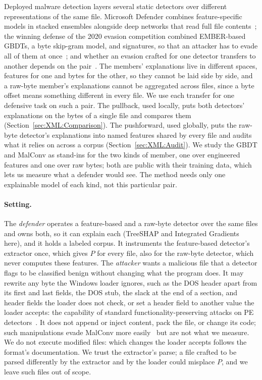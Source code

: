 Deployed malware detection layers several static detectors over different representations of the same file. Microsoft
Defender combines feature-specific models in stacked ensembles alongside deep networks that read full file
contents~\cite{microsoft2019insideout}; the winning defense of the 2020 evasion competition combined EMBER-based GBDTs, a
byte skip-gram model, and signatures, so that an attacker has to evade all of them at once~\cite{quiring2020against};
and whether an evasion crafted for one detector transfers to another depends on the pair~\cite{salman2024robustness}.
The members' explanations live in different spaces, features for one and bytes for the other, so they cannot be laid
side by side, and a raw-byte member's explanations cannot be aggregated across files, since a byte offset means
something different in every file. We use each transfer for one defensive task on such a pair. The
pullback, used locally, puts both detectors' explanations on the bytes of a single file and compares them
(Section~\ref{sec:XML:Comparison}). The pushforward, used globally, puts the raw-byte detector's explanations into named
features shared by every file and audits what it relies on across a corpus (Section~\ref{sec:XML:Audit}).
We study the GBDT and MalConv as stand-ins for the two kinds of member, one over engineered features and one over raw
bytes; both are public with their training data, which lets us measure what a defender would see. The method needs
only one explainable model of each kind, not this particular pair.

\paragraph{Setting.} The \emph{defender} operates a feature-based and a raw-byte detector over the same files and owns
both, so it can explain each (TreeSHAP and Integrated Gradients here), and it holds a labeled corpus. It instruments
the feature-based detector's extractor once, which gives $P$ for every file, also for the raw-byte detector, which
never computes these features. The \emph{attacker} wants a malicious file that a detector flags to be classified
benign without changing what the program does. It may rewrite any byte the Windows loader ignores, such as the DOS
header apart from its first and last fields, the DOS stub, the slack at the end of a section, and header fields the
loader does not check, or set a header field to another value the loader accepts: the capability of standard
functionality-preserving attacks on PE detectors~\cite{demetrio2021adversarial}. It does not append or inject content,
pack the file, or change its code; such manipulations evade MalConv more easily~\cite{kolosnjaji2018adversarial,
demetrio2021adversarial} but are not what we measure. We do not execute modified files: which changes the loader
accepts follows the format's documentation. We trust the extractor's parse; a file crafted to be parsed differently by
the extractor and by the loader could misplace $P$, and we leave such files out of scope.

